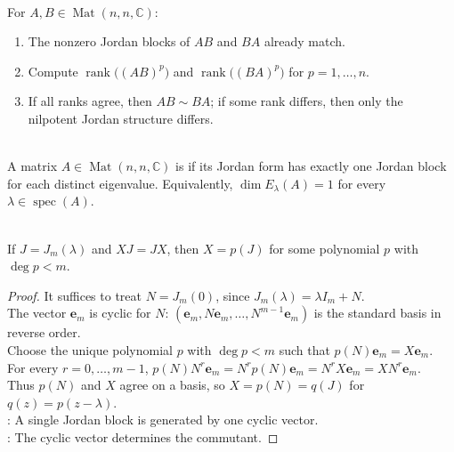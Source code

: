 \begin{method} \label{meth:checking-ab-ba-similarity} \\
For $A,B\in\operatorname{Mat}(n,n,\mathbb{C})$:
\begin{enumerate}[label=(\roman*)]
\setlength{\itemsep}{0pt}
\item The nonzero Jordan blocks of $AB$ and $BA$ already match.
\item Compute $\operatorname{rank}\bigl((AB)^p\bigr)$ and $\operatorname{rank}\bigl((BA)^p\bigr)$ for $p=1,\ldots,n$.
\item If all ranks agree, then $AB\sim BA$; if some rank differs, then only the nilpotent Jordan structure differs.
\end{enumerate}
\end{method}

\begin{definition} \label{def:nonderogatory-matrix} \\
A matrix $A\in\operatorname{Mat}(n,n,\mathbb{C})$ is  if its Jordan form has exactly one Jordan block for each distinct eigenvalue. Equivalently, $\dim E_{\lambda}(A)=1$ for every $\lambda\in\operatorname{spec}(A)$.
\end{definition}

\begin{lemma} \label{lem:single-jordan-block-commutant-polynomials} \\
If $J=J_m(\lambda)$ and $XJ=JX$, then $X=p(J)$ for some polynomial $p$ with $\deg p<m$.
\begin{proof}
It suffices to treat $N=J_m(0)$, since $J_m(\lambda)=\lambda I_m+N$.\\
The vector $\mathbf{e}_m$ is cyclic for $N$: $(\mathbf{e}_m,N\mathbf{e}_m,\ldots,N^{m-1}\mathbf{e}_m)$ is the standard basis in reverse order.\\
Choose the unique polynomial $p$ with $\deg p<m$ such that $p(N)\mathbf{e}_m=X\mathbf{e}_m$.\\
For every $r=0,\ldots,m-1$, $p(N)N^r\mathbf{e}_m=N^rp(N)\mathbf{e}_m=N^rX\mathbf{e}_m=XN^r\mathbf{e}_m$.\\
Thus $p(N)$ and $X$ agree on a basis, so $X=p(N)=q(J)$ for $q(z)=p(z-\lambda)$.\\
: A single Jordan block is generated by one cyclic vector.\\
: The cyclic vector determines the commutant.
\end{proof}
\end{lemma}

